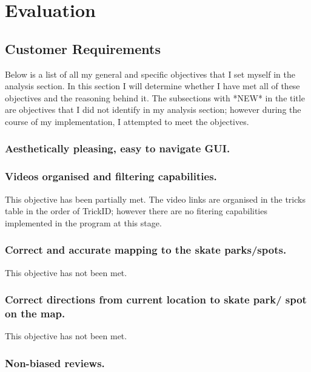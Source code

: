 \chapter{Evaluation}

\section{Customer Requirements}

Below is a list of all my general and specific objectives that I set myself in the analysis section. In this section I will determine whether I have met all of these objectives and the reasoning behind it. The subsections with *NEW* in the title are objectives that I did not identify in my analysis section; however during the course of my implementation, I attempted to meet the objectives. 

\subsection{Aesthetically pleasing, easy to navigate GUI.} %




\subsection{Videos organised and filtering capabilities.}

This objective has been partially met. The video links are organised in the tricks table in the order of TrickID; however there are no fitering capabilities implemented in the program at this stage. 



\subsection{Correct and accurate mapping to the skate parks/spots.}

This objective has not been met.



\subsection {Correct directions from current location to skate park/ spot on the map.}

This objective has not been met.



\subsection{Non-biased reviews.}


